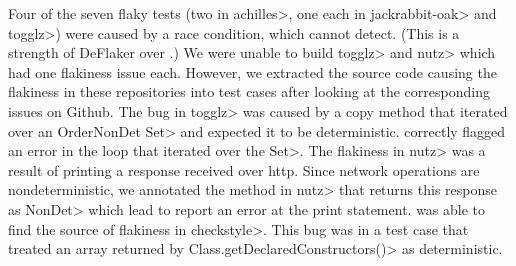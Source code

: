 Four of the seven flaky tests (two in \<achilles>, one each in \<jackrabbit-oak> and \<togglz>)
were caused by a race condition, which \theDeterminismChecker
cannot detect.  (This is a strength of DeFlaker over \theDeterminismChecker.)
We were unable to build \<togglz> and \<nutz> which had one flakiness issue each.
However, we extracted the source code causing the flakiness in these repositories into test cases
after looking at the corresponding issues on Github. The bug in \<togglz> was caused by a copy method that iterated over
an \<OrderNonDet Set> and expected it to be deterministic. \TheDeterminismChecker correctly flagged
an error in the loop that iterated over the \<Set>.
The flakiness in \<nutz> was a result of printing a response received over http.
Since network operations are nondeterministic, we annotated the method in \<nutz> that
returns this response as \<NonDet> which lead \TheDeterminismChecker to report an error at the print statement. 
\TheDeterminismChecker was able to find the source of flakiness in \<checkstyle>. This bug was in a test
case that treated an array returned by \<Class.getDeclaredConstructors()>
as deterministic.
